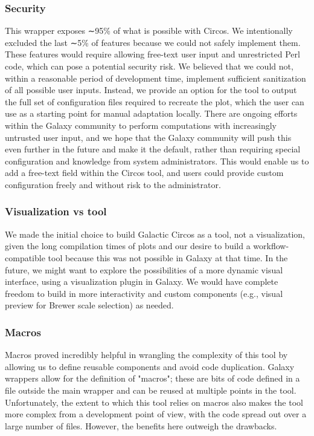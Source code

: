 \subsubsection*{Security}

This wrapper exposes ∼95\% of what is possible with Circos. We intentionally excluded the last ∼5\% of features because we could not safely implement them. These features would require allowing free-text user input and unrestricted Perl code, which can pose a potential security risk.
We believed that we could not, within a reasonable period of development time, implement sufficient sanitization of all possible user inputs. Instead, we provide an option for the tool to output the full set of configuration files required to recreate the plot, which the user can use as a starting point for manual adaptation locally.
There are ongoing efforts within the Galaxy community to perform computations with increasingly untrusted user input, and we hope that the Galaxy community will push this even further in the future and make it the default, rather than requiring special configuration and knowledge from system administrators.
This would enable us to add a free-text field within the Circos tool, and users could provide custom configuration freely and without risk to the administrator.

\subsubsection*{Visualization vs tool}

We made the initial choice to build Galactic Circos as a tool, not a visualization, given the long compilation times of plots and our desire to build a workflow-compatible tool because this was not possible in Galaxy at that time.
In the future, we might want to explore the possibilities of a more dynamic visual interface, using a visualization plugin in Galaxy. We would have complete freedom to build in more interactivity and custom components (e.g., visual preview for Brewer scale selection) as needed.

\subsubsection*{Macros}

Macros proved incredibly helpful in wrangling the complexity of this tool by allowing us to define reusable components and avoid code duplication. Galaxy wrappers allow for the definition of "macros"; these are bits of code defined in a file outside the main wrapper and can be reused at multiple points in the tool. Unfortunately, the extent to which this tool relies on macros also makes the tool more complex from a development point of view, with the code spread out over a large number of files. However, the benefits here outweigh the drawbacks.

